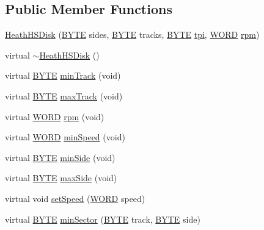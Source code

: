 \subsection*{Public Member Functions}
\begin{DoxyCompactItemize}
\item 
\hyperlink{classHeathHSDisk_a9e8fc6e7f6f73358a3549e65d7bc5329}{Heath\+H\+S\+Disk} (\hyperlink{hi__types_8h_aae9749d96e15ccb4f482dd5f55d98f9b}{B\+Y\+T\+E} sides, \hyperlink{hi__types_8h_aae9749d96e15ccb4f482dd5f55d98f9b}{B\+Y\+T\+E} tracks, \hyperlink{hi__types_8h_aae9749d96e15ccb4f482dd5f55d98f9b}{B\+Y\+T\+E} \hyperlink{classHeathHSDisk_a4e239f96246529917c1dd93b60d827f1}{tpi}, \hyperlink{hi__types_8h_ab24077addd3b7b13e086987ff296552c}{W\+O\+R\+D} \hyperlink{classHeathHSDisk_a36d5d61fd38847d4c134d90ae8e510f0}{rpm})
\item 
virtual \hyperlink{classHeathHSDisk_a02451f9821ae7be158fba6f016ea7104}{$\sim$\+Heath\+H\+S\+Disk} ()
\item 
virtual \hyperlink{hi__types_8h_aae9749d96e15ccb4f482dd5f55d98f9b}{B\+Y\+T\+E} \hyperlink{classHeathHSDisk_ab7abec89aef5dd0ae8ed8b104a5b8b3c}{min\+Track} (void)
\item 
virtual \hyperlink{hi__types_8h_aae9749d96e15ccb4f482dd5f55d98f9b}{B\+Y\+T\+E} \hyperlink{classHeathHSDisk_ae455573864dd89853134a95cbc2893a7}{max\+Track} (void)
\item 
virtual \hyperlink{hi__types_8h_ab24077addd3b7b13e086987ff296552c}{W\+O\+R\+D} \hyperlink{classHeathHSDisk_a36d5d61fd38847d4c134d90ae8e510f0}{rpm} (void)
\item 
virtual \hyperlink{hi__types_8h_ab24077addd3b7b13e086987ff296552c}{W\+O\+R\+D} \hyperlink{classHeathHSDisk_a796caffc99e5048a709a2703a430a0df}{min\+Speed} (void)
\item 
virtual \hyperlink{hi__types_8h_aae9749d96e15ccb4f482dd5f55d98f9b}{B\+Y\+T\+E} \hyperlink{classHeathHSDisk_a02d2101b06ef466dc1e0a42cf41da594}{min\+Side} (void)
\item 
virtual \hyperlink{hi__types_8h_aae9749d96e15ccb4f482dd5f55d98f9b}{B\+Y\+T\+E} \hyperlink{classHeathHSDisk_a585c615a67138ba4a0321476b2871954}{max\+Side} (void)
\item 
virtual void \hyperlink{classHeathHSDisk_aa8c5e98209dc52d1e1aa0b8708801a2d}{set\+Speed} (\hyperlink{hi__types_8h_ab24077addd3b7b13e086987ff296552c}{W\+O\+R\+D} speed)
\item 
virtual \hyperlink{hi__types_8h_aae9749d96e15ccb4f482dd5f55d98f9b}{B\+Y\+T\+E} \hyperlink{classHeathHSDisk_a66a18549377bf44ed5881e1ccc2777c6}{min\+Sector} (\hyperlink{hi__types_8h_aae9749d96e15ccb4f482dd5f55d98f9b}{B\+Y\+T\+E} track, \hyperlink{hi__types_8h_aae9749d96e15ccb4f482dd5f55d98f9b}{B\+Y\+T\+E} side)

\end{DoxyCompactItemize}
